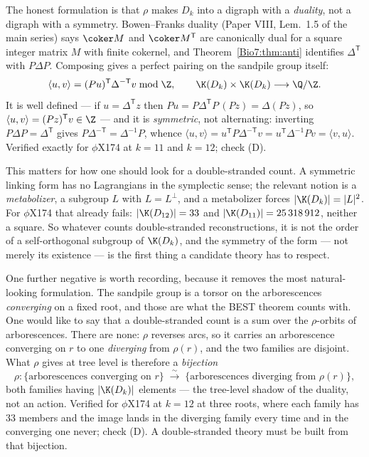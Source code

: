 \begin{remark}\label{Bio7:rem:pairing}
The honest formulation is that $\rho$ makes $D_k$ into a digraph with a \emph{duality}, not a
digraph with a symmetry. Bowen--Franks duality (Paper VIII, Lem.~1.5 of the main series) says
$\coker M$ and $\coker M^{\mathsf T}$ are canonically dual for a square integer matrix $M$
with finite cokernel, and Theorem~\ref{Bio7:thm:anti} identifies $\Delta^{\mathsf T}$ with
$P\Delta P$. Composing gives a perfect pairing on the sandpile group itself:
\[
  \langle u,v\rangle=(Pu)^{\mathsf T}\Delta^{-\mathsf T}v \bmod \Z,
  \qquad \K(D_k)\times\K(D_k)\longrightarrow\Q/\Z .
\]
It is well defined --- if $u=\Delta^{\mathsf T}z$ then $Pu=P\Delta^{\mathsf T}P\,(Pz)=
\Delta(Pz)$, so $\langle u,v\rangle=(Pz)^{\mathsf T}v\in\Z$ --- and it is
\emph{symmetric}, not alternating: inverting $P\Delta P=\Delta^{\mathsf T}$ gives
$P\Delta^{-\mathsf T}=\Delta^{-1}P$, whence
$\langle u,v\rangle=u^{\mathsf T}P\Delta^{-\mathsf T}v=u^{\mathsf T}\Delta^{-1}Pv=
\langle v,u\rangle$. Verified exactly for $\phi$X174 at $k=11$ and $k=12$; check (D).

This matters for how one should look for a double-stranded count. A symmetric linking form
has no Lagrangians in the symplectic sense; the relevant notion is a \emph{metabolizer}, a
subgroup $L$ with $L=L^{\perp}$, and a metabolizer forces $|\K(D_k)|=|L|^{2}$. For $\phi$X174
that already fails: $|\K(D_{12})|=33$ and $|\K(D_{11})|=25\,318\,912$, neither a square. So
whatever counts double-stranded reconstructions, it is not the order of a self-orthogonal
subgroup of $\K(D_k)$, and the symmetry of the form --- not merely its existence --- is the
first thing a candidate theory has to respect.

One further negative is worth recording, because it removes the most natural-looking
formulation. The sandpile group is a torsor on the arborescences \emph{converging} on a fixed
root, and those are what the BEST theorem counts with. One would like to say that a
double-stranded count is a sum over the $\rho$-orbits of arborescences. There are none:
$\rho$ reverses arcs, so it carries an arborescence converging on $r$ to one
\emph{diverging} from $\rho(r)$, and the two families are disjoint. What $\rho$ gives at
tree level is therefore a \emph{bijection}
\[
  \rho\colon \{\text{arborescences converging on } r\}
  \;\xrightarrow{\ \sim\ }\;
  \{\text{arborescences diverging from } \rho(r)\},
\]
both families having $|\K(D_k)|$ elements --- the tree-level shadow of the duality, not an
action. Verified for $\phi$X174 at $k=12$ at three roots, where each family has $33$ members
and the image lands in the diverging family every time and in the converging one never;
check (D). A double-stranded theory must be built from that bijection.
\end{remark}

